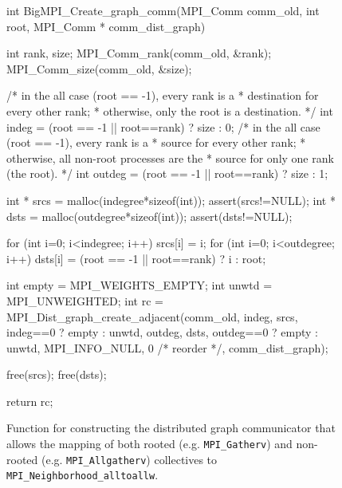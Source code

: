 \begin{figure}
\begin{code}
int BigMPI_Create_graph_comm(MPI_Comm comm_old, int root, 
                             MPI_Comm * comm_dist_graph)
{
    int rank, size;
    MPI_Comm_rank(comm_old, &rank);
    MPI_Comm_size(comm_old, &size);

    /* in the all case (root == -1), every rank is a 
     * destination for every other rank;
     * otherwise, only the root is a destination. */
    int indeg  = (root == -1 || root==rank) ? size : 0;
    /* in the all case (root == -1), every rank is a 
     * source for every other rank;
     * otherwise, all non-root processes are the 
     * source for only one rank (the root). */
    int outdeg = (root == -1 || root==rank) ? size : 1;

    int * srcs = malloc(indegree*sizeof(int));  
    assert(srcs!=NULL);
    int * dsts = malloc(outdegree*sizeof(int)); 
    assert(dsts!=NULL);

    for (int i=0; i<indegree; i++) {
        srcs[i] = i;
    }
    for (int i=0; i<outdegree; i++) {
        dsts[i] = (root == -1 || root==rank) ? i : root;
    }

    int empty = MPI_WEIGHTS_EMPTY;
    int unwtd = MPI_UNWEIGHTED;
    int rc = MPI_Dist_graph_create_adjacent(comm_old,
                indeg, srcs, indeg==0 ? empty : unwtd,
                outdeg, dsts, outdeg==0 ? empty : unwtd,
                MPI_INFO_NULL, 0 /* reorder */, 
                comm_dist_graph);

    free(srcs);
    free(dsts);

    return rc;
}
\end{code}
\caption{Function for constructing the distributed graph communicator
that allows the mapping of both rooted (e.g. \texttt{MPI\_Gatherv}) and
non-rooted (e.g. \texttt{MPI\_Allgatherv}) collectives to
\texttt{MPI\_Neighborhood\_alltoallw}.}
\label{code:BigMPI_Create_graph_comm}
\end{figure}
